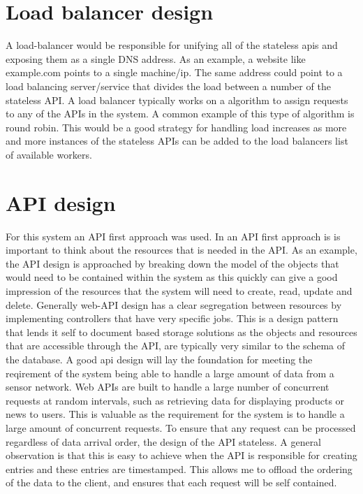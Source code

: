 \documentclass[]{uiophd}
\begin{document}
\section{Load balancer design}
A load-balancer would be responsible for unifying all of the stateless apis and exposing them as a single DNS address. As an example, a website like example.com points to a single machine/ip. The same address could point to a load balancing server/service that divides the load between a number of the stateless API. A load balancer typically works on a algorithm to assign requests to any of the APIs in the system. A common example of this type of algorithm is round robin. This would be a good strategy for handling load increases as more and more instances of the stateless APIs can be added to the load balancers list of available workers.

\section{API design}
For this system an API first approach was used. In an API first approach is is important to think about the resources that is needed in the API. As an example, the API design is approached by breaking down the model of the objects that would need to be contained within the system as this quickly can give a good impression of the resources that the system will need to create, read, update and delete. Generally web-API design has a clear segregation between resources by implementing controllers that have very specific jobs. This is a design pattern that lends it self to document based storage solutions as the objects and resources that are accessible through the API, are typically very similar to the schema of the database. A good api design will lay  the foundation for meeting the reqirement of the system being able to handle a large amount of data from a sensor network. Web APIs are built to handle a large number of concurrent requests at random intervals, such as retrieving data for displaying products or news to users. This is valuable as the requirement for the system is to handle a large amount of concurrent requests. To ensure that any request can be processed regardless of data arrival order, the design of the API stateless. A general observation is that this is easy to achieve when the API is responsible for creating entries and these entries are timestamped. This allows me to offload the ordering of the data to the client, and ensures that each request will be self contained.
\end{document}
